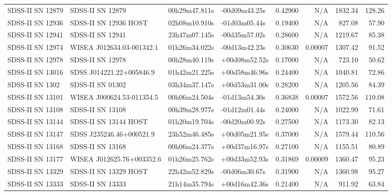 \begin{longtable}{llllrrrr}
SDSS-II SN 12879 &                SDSS-II SN 12879 &   00h29m47.811s &   -00d09m43.25s &  0.42900 &      N/A &  1832.34 &      128.26 \\
SDSS-II SN 12936 &           SDSS-II SN 12936 HOST &   02h08m10.910s &   -01d03m05.44s &  0.19400 &      N/A &   827.08 &       57.90 \\
SDSS-II SN 12941 &                SDSS-II SN 12941 &   23h47m07.145s &   -00d35m57.02s &  0.28600 &      N/A &  1219.67 &       85.38 \\
SDSS-II SN 12974 &       WISEA J012634.03-001342.1 &   01h26m34.022s &   -00d13m42.23s &  0.30630 &  0.00007 &  1307.42 &       91.52 \\
SDSS-II SN 12978 &                SDSS-II SN 12978 &   00h28m40.119s &   +00d08m52.52s &  0.17000 &      N/A &   723.10 &       50.62 \\
SDSS-II SN 13016 &        SDSS J014221.22+005846.9 &   01h42m21.225s &   +00d58m46.96s &  0.24400 &      N/A &  1040.81 &       72.86 \\
SDSS-II SN 1302  &                SDSS-II SN 01302 &   03h34m37.147s &   +00d53m31.00s &  0.28200 &      N/A &  1205.56 &       84.39 \\
SDSS-II SN 13101 &       WISEA J000624.53-011354.5 &   00h06m24.504s &   -01d13m54.30s &  0.36838 &  0.00007 &  1572.56 &      110.08 \\
SDSS-II SN 13108 &                SDSS-II SN 13108 &   00h39m28.977s &   -01d12m01.44s &  0.24000 &      N/A &  1022.99 &       71.61 \\
SDSS-II SN 13144 &           SDSS-II SN 13144 HOST &   01h20m19.704s &   -00d20m00.92s &  0.27500 &      N/A &  1173.30 &       82.13 \\
SDSS-II SN 13147 &        SDSS J235246.46+000521.9 &   23h52m46.485s &   +00d05m21.95s &  0.37000 &      N/A &  1579.44 &      110.56 \\
SDSS-II SN 13168 &                SDSS-II SN 13168 &   00h06m24.377s &   +00d37m16.97s &  0.27100 &      N/A &  1155.51 &       80.89 \\
SDSS-II SN 13177 &       WISEA J012625.76+003352.6 &   01h26m25.762s &   +00d33m52.93s &  0.31869 &  0.00009 &  1360.47 &       95.23 \\
SDSS-II SN 13329 &           SDSS-II SN 13329 HOST &   22h42m52.829s &   -00d06m30.67s &  0.31900 &      N/A &  1360.98 &       95.27 \\
SDSS-II SN 13333 &                SDSS-II SN 13333 &   21h14m35.794s &   +00d16m42.36s &  0.21400 &      N/A &   911.92 &       63.84 \\

\end{longtable}
